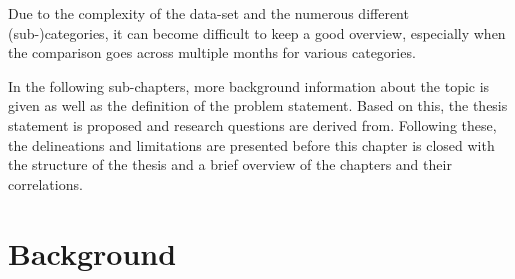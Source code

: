 Due to the complexity of the data-set and the numerous different (sub-)categories, it can become difficult to keep a good overview, especially when the comparison goes across multiple months for various categories.

In the following sub-chapters, more background information about the topic is given as well as the definition of the problem statement. Based on this, the thesis statement is proposed and research questions are derived from. Following these, the delineations and limitations are presented before this chapter is closed with the structure of the thesis and a brief overview of the chapters and their correlations.



\section{Background}

